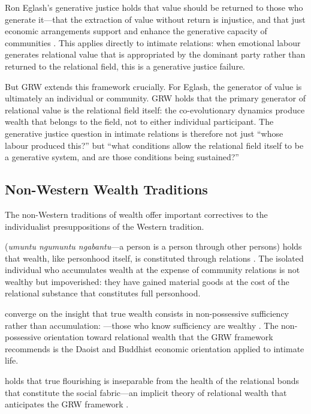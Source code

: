 \noindent
Ron Eglash's generative justice holds that value should be returned to those who generate it---that the extraction of value without return is injustice, and that just economic arrangements support and enhance the generative capacity of communities \parencite{eglash2016}. This applies directly to intimate relations: when emotional labour generates relational value that is appropriated by the dominant party rather than returned to the relational field, this is a generative justice failure.

But GRW extends this framework crucially. For Eglash, the generator of value is ultimately an individual or community. GRW holds that the primary generator of relational value is the relational field itself: the co-evolutionary dynamics produce wealth that belongs to the field, not to either individual participant. The generative justice question in intimate relations is therefore not just ``whose labour produced this?'' but ``what conditions allow the relational field itself to be a generative system, and are those conditions being sustained?''

\subsection{Non-Western Wealth Traditions}
\label{p15:subsec:nonwestern}

\noindent
The non-Western traditions of wealth offer important correctives to the individualist presuppositions of the Western tradition.

 (\emph{umuntu ngumuntu ngabantu}---a person is a person through other persons) holds that wealth, like personhood itself, is constituted through relations \parencite{mbiti1970,metz2011}. The isolated individual who accumulates wealth at the expense of community relations is not wealthy but impoverished: they have gained material goods at the cost of the relational substance that constitutes full personhood.

 converge on the insight that true wealth consists in non-possessive sufficiency rather than accumulation: ---those who know sufficiency are wealthy \parencite{laozi1963}. The non-possessive orientation toward relational wealth that the GRW framework recommends is the Daoist and Buddhist economic orientation applied to intimate life.

 holds that true flourishing is inseparable from the health of the relational bonds that constitute the social fabric---an implicit theory of relational wealth that anticipates the GRW framework \parencite{tu1985}.

